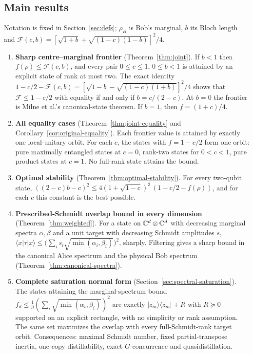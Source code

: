 \documentclass[11pt,a4paper]{article}
\theoremstyle{remark}\newtheorem{remark}[theorem]{Remark}
\newcommand{\ket}[1]{\lvert #1\rangle}\newcommand{\bra}[1]{\langle #1\rvert}
\newcommand{\Fe}{\mathcal F}
\begin{document}
\subsection{Main results}
Notation is fixed in Section~\ref{sec:defs}; $\rho_B$ is Bob's marginal, $b$
its Bloch length and $\Fe(c,b)=[\sqrt{1+b}+\sqrt{(1-c)(1-b)}]^2/4$.
\begin{enumerate}[leftmargin=2em,itemsep=3pt]
\item \textbf{Sharp centre--marginal frontier}
(Theorem~\ref{thm:joint}). If $b<1$ then $f(\rho)\le\Fe(c,b)$, and every pair
$0\le c\le1$, $0\le b<1$ is attained by an explicit state of rank at most two. The exact
identity $1-c/2-\Fe(c,b)=[\sqrt{1-b}-\sqrt{(1-c)(1+b)}]^2/4$ shows that
$\Fe\le1-c/2$ with equality if and only if $b=c/(2-c)$. At $b=0$ the
frontier is Milne et al.'s canonical-state theorem. If $b=1$, then
$f=(1+c)/4$.
\item \textbf{All equality cases} (Theorem~\ref{thm:joint-equality} and
Corollary~\ref{cor:original-equality}). Each frontier value is attained by
exactly one local-unitary orbit. For each $c$, the states with $f=1-c/2$
form one orbit: pure maximally entangled states at $c=0$, rank-two states
for $0<c<1$, pure product states at $c=1$. No full-rank state attains the
bound.
\item \textbf{Optimal stability} (Theorem~\ref{thm:optimal-stability}). For
every two-qubit state,
$((2-c)b-c)^2\le4(1+\sqrt{1-c})^2\,(1-c/2-f(\rho))$, and for each $c$ this
constant is the best possible.
\item \textbf{Prescribed-Schmidt overlap bound in every dimension}
(Theorem~\ref{thm:weighted}). For a state on $\mathbb C^d\otimes\mathbb C^d$ with
decreasing marginal spectra $\alpha,\beta$ and a unit target with
decreasing Schmidt amplitudes $s$,
$\bra x\tau\ket x\le\bigl(\sum_is_i\sqrt{\min(\alpha_i,\beta_i)}\bigr)^2$,
sharply. Filtering gives a sharp bound in the canonical Alice spectrum and
the physical Bob spectrum (Theorem~\ref{thm:canonical-spectra}).
\item \textbf{Complete saturation normal form}
(Section~\ref{sec:spectral-saturation}). The states attaining the
marginal-spectrum bound $f_d\le\frac1d(\sum_i\sqrt{\min(\alpha_i,\beta_i)})^2$
are exactly $\ket{z_m}\bra{z_m}+R$ with $R\succeq0$ supported on an explicit
rectangle, with no simplicity or rank assumption. The same set maximizes the
overlap with every full-Schmidt-rank target orbit. Consequences: maximal
Schmidt number, fixed partial-transpose inertia, one-copy distillability,
exact $G$-concurrence and quasidistillation.

\end{enumerate}
\end{document}
